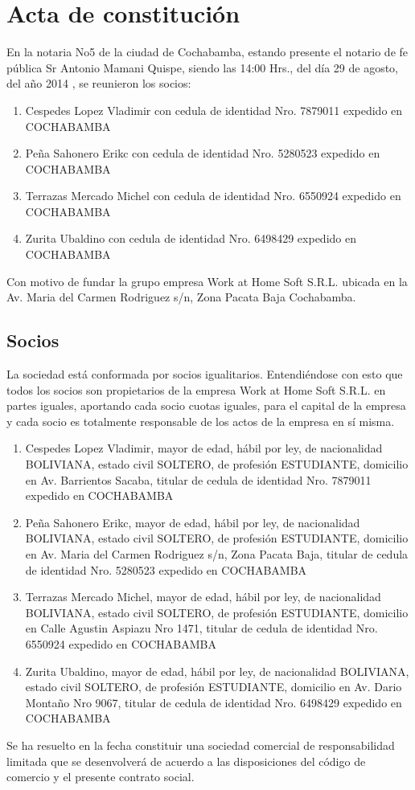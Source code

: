 \documentclass[11pt,letterpaper]{report}
\begin{document}
\section{Acta de constituci\'on}
En la notaria No5 de la ciudad de Cochabamba, estando presente el notario de fe p\'ublica Sr Antonio Mamani Quispe, siendo las 14:00 Hrs., del d\'ia 29 de agosto, del a\~no 2014 , se reunieron los socios:\\
\begin{enumerate}
\item Cespedes Lopez Vladimir con cedula de identidad Nro. 7879011 expedido en
COCHABAMBA
\item Pe\~na Sahonero Erikc con cedula de identidad Nro. 5280523 expedido en
COCHABAMBA
\item Terrazas Mercado Michel con cedula de identidad Nro. 6550924 expedido en
COCHABAMBA
\item Zurita Ubaldino con cedula de identidad Nro. 6498429 expedido en
COCHABAMBA
\end{enumerate}
Con motivo de fundar la grupo empresa Work at Home Soft S.R.L. ubicada en la Av. Maria del Carmen Rodriguez s/n, Zona Pacata Baja Cochabamba.
\subsection{ Socios } 
La sociedad est\'a conformada por socios igualitarios. Entendi\'endose con esto que todos los socios
son propietarios de la empresa Work at Home Soft S.R.L. en partes iguales, aportando cada socio
cuotas iguales, para el capital de la empresa y cada socio es totalmente responsable de los actos de
la empresa en s\'i misma.\\
\begin{enumerate}
\item Cespedes Lopez Vladimir, mayor de edad, h\'abil por ley, de nacionalidad BOLIVIANA, estado civil SOLTERO, de profesi\'on ESTUDIANTE, domicilio en Av. Barrientos Sacaba, titular de cedula de identidad Nro. 7879011 expedido en COCHABAMBA
\item Pe\~na Sahonero Erikc, mayor de edad, h\'abil por ley, de nacionalidad BOLIVIANA, estado civil SOLTERO, de profesi\'on ESTUDIANTE, domicilio en  Av. Maria del Carmen Rodriguez s/n, Zona Pacata Baja, titular de cedula de identidad Nro. 5280523 expedido en COCHABAMBA
\item Terrazas Mercado Michel, mayor de edad, h\'abil por ley, de nacionalidad BOLIVIANA, estado civil SOLTERO, de profesi\'on ESTUDIANTE, domicilio en Calle Agustin Aspiazu Nro 1471, titular de cedula de identidad Nro. 6550924 expedido en COCHABAMBA
\item Zurita Ubaldino, mayor de edad, h\'abil por ley, de nacionalidad BOLIVIANA, estado civil SOLTERO, de profesi\'on ESTUDIANTE, domicilio en Av. Dario Monta\~no Nro 9067, titular de cedula de identidad Nro. 6498429 expedido en COCHABAMBA
\end{enumerate}
Se ha resuelto en la fecha constituir una sociedad comercial de responsabilidad limitada que se desenvolver\'a de acuerdo a las disposiciones del c\'odigo de comercio y el presente contrato social.
\end{document}
